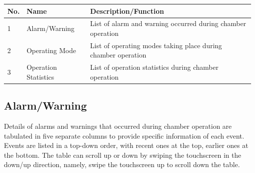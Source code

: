 \begin{longtable}[]{@{}lll@{}}
\toprule
\begin{minipage}[b]{0.04\columnwidth}\raggedright
No.\strut
\end{minipage} & \begin{minipage}[b]{0.23\columnwidth}\raggedright
Name\strut
\end{minipage} & \begin{minipage}[b]{0.65\columnwidth}\raggedright
Description/Function\strut
\end{minipage}\tabularnewline
\midrule
\endhead
\begin{minipage}[t]{0.04\columnwidth}\raggedright
1\strut
\end{minipage} & \begin{minipage}[t]{0.23\columnwidth}\raggedright
Alarm/Warning\strut
\end{minipage} & \begin{minipage}[t]{0.65\columnwidth}\raggedright
List of alarm and warning occurred during chamber operation\strut
\end{minipage}\tabularnewline
\begin{minipage}[t]{0.04\columnwidth}\raggedright
2\strut
\end{minipage} & \begin{minipage}[t]{0.23\columnwidth}\raggedright
Operating Mode\strut
\end{minipage} & \begin{minipage}[t]{0.65\columnwidth}\raggedright
List of operating modes taking place during chamber operation\strut
\end{minipage}\tabularnewline
\begin{minipage}[t]{0.04\columnwidth}\raggedright
3\strut
\end{minipage} & \begin{minipage}[t]{0.23\columnwidth}\raggedright
Operation Statistics\strut
\end{minipage} & \begin{minipage}[t]{0.65\columnwidth}\raggedright
List of operation statistics during chamber operation\strut
\end{minipage}\tabularnewline
\bottomrule
\end{longtable}


\subsection{Alarm/Warning}

Details of alarms and warnings that occurred during chamber operation
are tabulated in five separate columns to provide specific information
of each event. Events are listed in a top-down order, with recent ones
at the top, earlier ones at the bottom. The table can scroll up or down
by swiping the touchscreen in the down/up direction, namely, swipe the
touchscreen up to scroll down the table.

